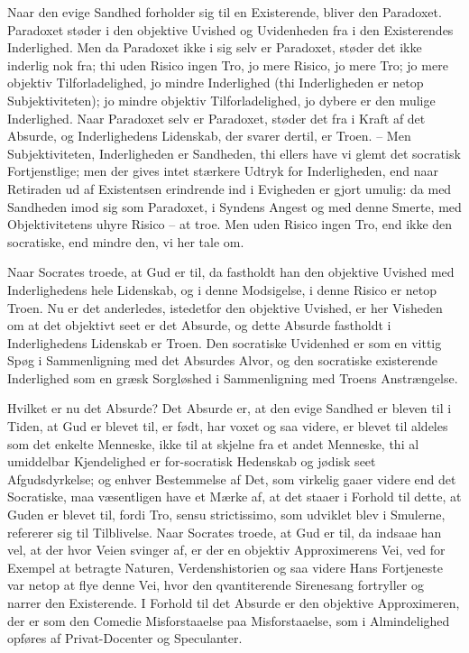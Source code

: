 \documentclass[12pt,a4paper]{article}
\begin{document}
Naar den evige Sandhed forholder sig til en Existerende, bliver den Paradoxet. Paradoxet støder i den objektive Uvished og Uvidenheden fra i den Existerendes Inderlighed. Men da Paradoxet ikke i sig selv er Paradoxet, støder det ikke inderlig nok fra; thi uden Risico ingen Tro, jo mere Risico, jo mere Tro; jo mere objektiv Tilforladelighed, jo mindre Inderlighed (thi Inderligheden er netop Subjektiviteten); jo mindre objektiv Tilforladelighed, jo dybere er den mulige Inderlighed. Naar Paradoxet selv er Paradoxet, støder det fra i Kraft af det Absurde, og Inderlighedens Lidenskab, der svarer dertil, er Troen. – Men Subjektiviteten, Inderligheden er Sandheden, thi ellers have vi glemt det socratisk Fortjenstlige; men der gives intet stærkere Udtryk for Inderligheden, end naar Retiraden ud af Existentsen erindrende ind i Evigheden er gjort umulig: da med Sandheden imod sig som Paradoxet, i Syndens Angest og med denne Smerte, med Objektivitetens uhyre Risico – at troe. Men uden Risico ingen Tro, end ikke den socratiske, end mindre den, vi her tale om.

Naar Socrates troede, at Gud er til, da fastholdt han den objektive Uvished med Inderlighedens hele Lidenskab, og i denne Modsigelse, i denne Risico er netop Troen. Nu er det anderledes, istedetfor den objektive Uvished, er her Visheden om at det objektivt seet er det Absurde, og dette Absurde fastholdt i Inderlighedens Lidenskab er Troen. Den socratiske Uvidenhed er som en vittig Spøg i Sammenligning med det Absurdes Alvor, og den socratiske existerende Inderlighed som en græsk Sorgløshed i Sammenligning med Troens Anstrængelse.

Hvilket er nu det Absurde? Det Absurde er, at den evige Sandhed er bleven til i Tiden, at Gud er blevet til, er født, har voxet og saa videre, er blevet til aldeles som det enkelte Menneske, ikke til at skjelne fra et andet Menneske, thi al umiddelbar Kjendelighed er for-socratisk Hedenskab og jødisk seet Afgudsdyrkelse; og enhver Bestemmelse af Det, som virkelig gaaer videre end det Socratiske, maa væsentligen have et Mærke af, at det staaer i Forhold til dette, at Guden er blevet til, fordi Tro, sensu strictissimo, som udviklet blev i Smulerne, refererer sig til Tilblivelse. Naar Socrates troede, at Gud er til, da indsaae han vel, at der hvor Veien svinger af, er der en objektiv Approximerens Vei, ved for Exempel at betragte Naturen, Verdenshistorien og saa videre Hans Fortjeneste var netop at flye denne Vei, hvor den qvantiterende Sirenesang fortryller og narrer den Existerende. I Forhold til det Absurde er den objektive Approximeren, der er som den Comedie Misforstaaelse paa Misforstaaelse, som i Almindelighed opføres af Privat-Docenter og Speculanter.
\end{document}
